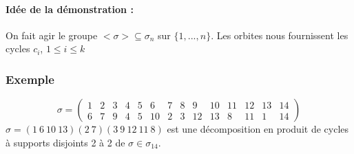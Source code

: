 \documentclass[a4paper, oneside]{report}
\newcommand{\exem}{\subsubsection{Exemple}}
\begin{document}
\paragraph{Idée de la démonstration :}
On fait agir le groupe $<\sigma> \subseteq \sigma_n$ sur $\{1,...,n\}$. Les orbites nous fournissent les cycles $c_i$, $1\leq i \leq k$

\exem
$$\sigma = \left(\begin{array}{llllllllllllll}
1&2&3&4&5&6&7&8&9&10&11&12&13&14\\
6&7&9&4&5&10&2&3&12&13&8&11&1&14
\end{array}\right)$$
$\sigma = (1~6~10~13)(2~7)(3~9~12~11~8)$ est une décomposition en produit de cycles à supports disjoints 2 à 2 de $\sigma \in \sigma_{14}$.
\end{document}
